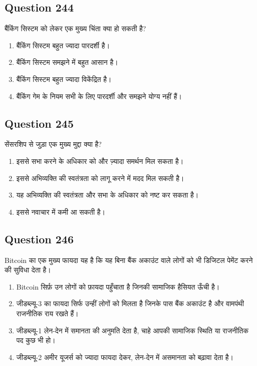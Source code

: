 \documentclass[12pt,a4paper]{article}
\begin{document}
\bigskip


\subsection*{Question 244}
बैंकिंग सिस्टम को लेकर एक मुख्य चिंता क्या हो सकती है?

\begin{enumerate}[label=\Alph*., leftmargin=*]
\item बैंकिंग सिस्टम बहुत ज्यादा पारदर्शी है।
\item बैंकिंग सिस्टम समझने में बहुत आसान है।
\item बैंकिंग सिस्टम बहुत ज्यादा विकेंद्रित है।
\item बैंकिंग गेम के नियम सभी के लिए पारदर्शी और समझने योग्य नहीं हैं।
\end{enumerate}

\bigskip


\subsection*{Question 245}
सेंसरशिप से जुड़ा एक मुख्य मुद्दा क्या है?

\begin{enumerate}[label=\Alph*., leftmargin=*]
\item इससे सभा करने के अधिकार को और ज़्यादा समर्थन मिल सकता है।
\item इससे अभिव्यक्ति की स्वतंत्रता को लागू करने में मदद मिल सकती है।
\item यह अभिव्यक्ति की स्वतंत्रता और सभा के अधिकार को नष्ट कर सकता है।
\item इससे नवाचार में कमी आ सकती है।
\end{enumerate}

\bigskip


\subsection*{Question 246}
Bitcoin का एक मुख्य फायदा यह है कि यह बिना बैंक अकाउंट वाले लोगों को भी डिजिटल पेमेंट करने की सुविधा देता है।

\begin{enumerate}[label=\Alph*., leftmargin=*]
\item Bitcoin सिर्फ़ उन लोगों को फ़ायदा पहुँचाता है जिनकी सामाजिक हैसियत ऊँची है।
\item जीडब्ल्यू-3 का फायदा सिर्फ उन्हीं लोगों को मिलता है जिनके पास बैंक अकाउंट है और वामपंथी राजनीतिक राय रखते हैं।
\item जीडब्ल्यू-1 लेन-देन में समानता की अनुमति देता है, चाहे आपकी सामाजिक स्थिति या राजनीतिक पद कुछ भी हो।
\item जीडब्ल्यू-2 अमीर यूजर्स को ज्यादा फायदा देकर, लेन-देन में असमानता को बढ़ावा देता है।
\end{enumerate}
\end{document}
